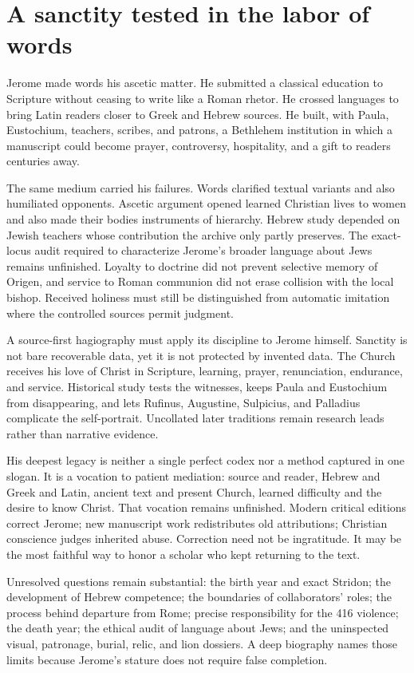 \section{A sanctity tested in the labor of words}\label{sec:jerome-synthesis}

Jerome made words his ascetic matter. He submitted a classical education to
Scripture without ceasing to write like a Roman rhetor. He crossed languages
to bring Latin readers closer to Greek and Hebrew sources. He built, with
Paula, Eustochium, teachers, scribes, and patrons, a Bethlehem institution in
which a manuscript could become prayer, controversy, hospitality, and a gift
to readers centuries away.

The same medium carried his failures. Words clarified textual variants and
also humiliated opponents. Ascetic argument opened learned Christian lives to
women and also made their bodies instruments of hierarchy. Hebrew study
depended on Jewish teachers whose contribution the archive only partly
preserves. The exact-locus audit required to characterize Jerome's broader
language about Jews remains unfinished. Loyalty to doctrine did not prevent
selective memory of Origen, and service to Roman communion did not erase
collision with the local bishop. Received holiness must still be distinguished
from automatic imitation where the controlled sources permit judgment.

A source-first hagiography must apply its discipline to Jerome himself.
Sanctity is not bare recoverable data, yet it is not protected by invented
data. The Church receives his love of Christ in Scripture, learning, prayer,
renunciation, endurance, and service. Historical study tests the witnesses,
keeps Paula and Eustochium from disappearing, and lets Rufinus, Augustine,
Sulpicius, and Palladius complicate the self-portrait. Uncollated later
traditions remain research leads rather than narrative evidence.

His deepest legacy is neither a single perfect codex nor a method captured in
one slogan. It is a vocation to patient mediation: source and reader, Hebrew
and Greek and Latin, ancient text and present Church, learned difficulty and
the desire to know Christ. That vocation remains unfinished. Modern critical
editions correct Jerome; new manuscript work redistributes old attributions;
Christian conscience judges inherited abuse. Correction need not be ingratitude.
It may be the most faithful way to honor a scholar who kept returning to the
text.

Unresolved questions remain substantial: the birth year and exact Stridon;
the development of Hebrew competence; the boundaries of collaborators' roles;
the process behind departure from Rome; precise responsibility for the 416
violence; the death year; the ethical audit of language about Jews; and the
uninspected visual, patronage, burial, relic, and lion dossiers. A deep
biography names those limits because Jerome's stature does not require false
completion.

